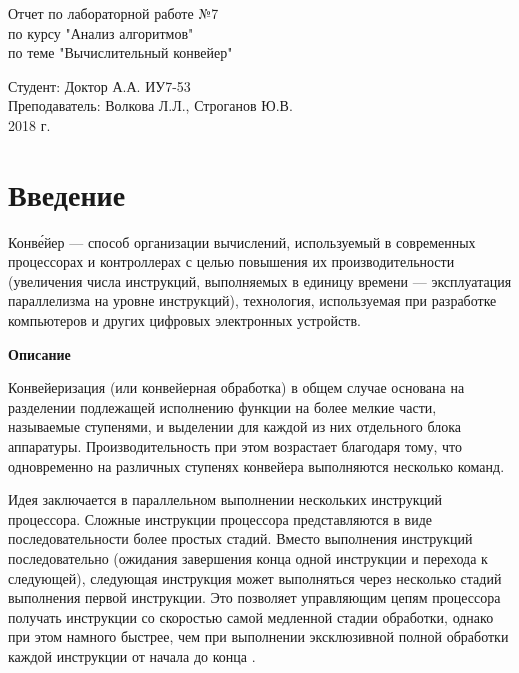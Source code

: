 \documentclass[a4paper, 14pt]{article}
\begin{document}
	\begin{titlepage}
		\begin{center}
			\begin{LARGE}
				Отчет по лабораторной работе №7\\
					по курсу "Анализ алгоритмов"\\
					по теме "Вычислительный конвейер"
			\end{LARGE}
		
			\begin{Large}
				\vspace{10cm}
				Студент: Доктор А.А. ИУ7-53\\
					Преподаватель: Волкова Л.Л.,
								   Строганов Ю.В.\\
				
				\vspace{5cm}2018 г.				   
			\end{Large}
			
		\end{center}
		 
	\end{titlepage}

\tableofcontents
	
\newpage
\section*{Введение}
\hspace{1cm}

Конве́йер — способ организации вычислений, используемый в современных процессорах и контроллерах с целью повышения их производительности (увеличения числа инструкций, выполняемых в единицу времени — эксплуатация параллелизма на уровне инструкций), технология, используемая при разработке компьютеров и других цифровых электронных устройств.

\begin{center}
\large\textbf{Описание}
\end{center}
 

Конвейеризация (или конвейерная обработка) в общем случае основана на разделении подлежащей исполнению функции на более мелкие части, называемые ступенями, и выделении для каждой из них отдельного блока аппаратуры. Производительность при этом возрастает благодаря тому, что одновременно на различных ступенях конвейера выполняются несколько команд.

Идея заключается в параллельном выполнении нескольких инструкций процессора. Сложные инструкции процессора представляются в виде последовательности более простых стадий. Вместо выполнения инструкций последовательно (ожидания завершения конца одной инструкции и перехода к следующей), следующая инструкция может выполняться через несколько стадий выполнения первой инструкции. Это позволяет управляющим цепям процессора получать инструкции со скоростью самой медленной стадии обработки, однако при этом намного быстрее, чем при выполнении эксклюзивной полной обработки каждой инструкции от начала до конца \cite{conveyor_opr}.
\end{document}
